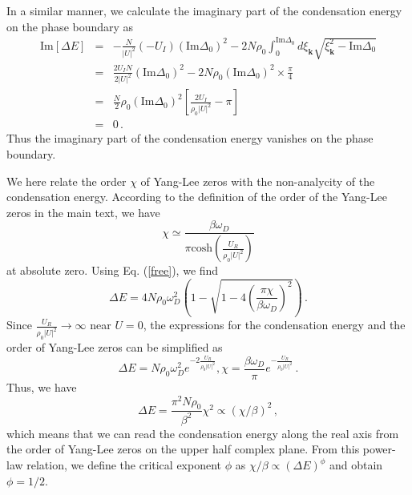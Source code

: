 \documentclass[aps,onecolumn,nofootinbib,superscriptaddress,notitlepage,longbibliography]{revtex4-1}
\begin{document}
In a similar manner, we calculate the imaginary part of the condensation energy on the phase boundary as
\begin{eqnarray}
  \text{Im} [\Delta E] & = & - \frac{N}{| U |^2} \left( - U_I \right)
  \left( \text{Im} \Delta_0 \right)^2 - 2 N \rho_0 \int_0^{\text{Im} \Delta_0}
  d \xi_{\bm{k}} \sqrt{\xi_{\bm{k}}^2 - \text{Im} \Delta_0} \nonumber\\
  & = & \frac{2U_I N}{2 | U |^2} \left( \text{Im} \Delta_0 \right)^2 - 2 N
  \rho_0 \left( \text{Im} \Delta_0 \right)^2 \times \frac{\pi}{4} \nonumber\\
  & = & \frac{N}{2} \rho_0 \left( \text{Im} \Delta_0 \right)^2 \left[
  \frac{2U_I}{\rho_0 | U |^2} - \pi \right] \nonumber\\
  & = & 0 \,.
\end{eqnarray}
Thus the imaginary part of the condensation energy vanishes on the phase boundary. 

We here relate the order $\chi$ of Yang-Lee zeros with the non-analycity of the condensation energy. According to the definition of the order of the Yang-Lee zeros in the main text, we have
\begin{equation}
    \chi\simeq\frac{\beta\omega_D}{\pi\text{cosh}(\frac{U_R}{\rho_0|U|^2})}
\end{equation}
at absolute zero. Using Eq. (\ref{free}), we find
\begin{equation}
    \Delta E=4N\rho_0\omega_D^2(1-\sqrt{1-4(\frac{\pi\chi}{\beta\omega_D})^2})\,.
\end{equation}
Since $\frac{U_R}{\rho_0|U|^2}\rightarrow\infty$ near $U=0$, the expressions for the condensation energy and the order of Yang-Lee zeros can be simplified as
\begin{equation}
    \Delta E=N \rho_0 \omega_D^2 e^{-2\frac{U_R}{\rho_0|U|^2}},\chi=\frac{\beta\omega_D}{\pi}e^{-\frac{U_R}{\rho_0|U|^2}}\,.
\end{equation}
Thus, we have
\begin{equation}
    \Delta E=\frac{\pi^2N\rho_0}{\beta^2}\chi^2\propto(\chi/\beta)^2\,,
\end{equation}
which means that we can read the condensation energy along the real axis from the order of Yang-Lee zeros on the upper half complex plane. From this power-law relation, we define the critical exponent $\phi$ as $\chi/\beta\propto(\Delta E)^{\phi}$ and obtain $\phi=1/2$.
\end{document}
